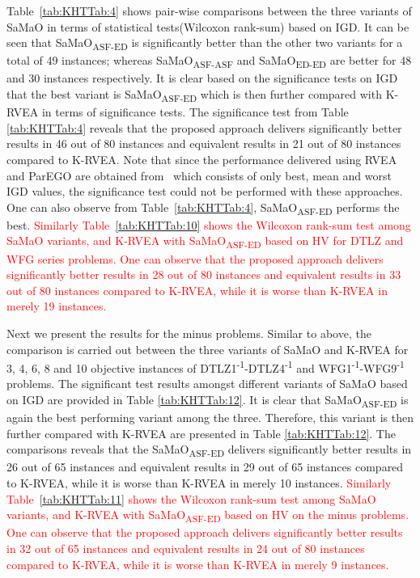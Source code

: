 \documentclass[twocolumn,10pt]{asme2ej}
\begin{document}
Table~\ref{tab:KHTTab:4} shows pair-wise comparisons between the three variants of SaMaO in terms of statistical tests(Wilcoxon rank-sum) based on IGD. It can be seen that SaMaO\textsubscript{ASF-ED} is significantly better than the other two variants for a total of 49 instances; whereas SaMaO\textsubscript{ASF-ASF} and SaMaO\textsubscript{ED-ED} are better for 48 and 30 instances respectively. It is clear based on the significance tests on IGD that the best variant is SaMaO\textsubscript{ASF-ED} which is then further compared with K-RVEA in terms of significance tests. The significance test from Table \ref{tab:KHTTab:4} reveals that the proposed approach delivers significantly better results in 46 out of 80 instances and equivalent results in 21 out of 80 instances compared to K-RVEA. Note that since the performance delivered using RVEA and ParEGO are obtained from~\cite{KHTchugh2016krvea} which consists of only best, mean and worst IGD values, the significance test could not be performed with these approaches. One can also observe from Table~\ref{tab:KHTTab:4}, SaMaO\textsubscript{ASF-ED} performs the best. \textcolor{red}{Similarly Table~\ref{tab:KHTTab:10} shows the Wilcoxon rank-sum test among SaMaO variants, and K-RVEA with SaMaO\textsubscript{ASF-ED} based on HV for DTLZ and WFG series problems. One can observe that the proposed approach delivers significantly better results in 28 out of 80 instances and equivalent results in 33 out of 80 instances compared to K-RVEA, while it is worse than K-RVEA in merely 19 instances.}


Next we present the results for the minus problems. Similar to above, the comparison is carried out between the three variants of SaMaO and K-RVEA for 3, 4, 6, 8 and 10 objective instances of DTLZ1\textsuperscript{-1}-DTLZ4\textsuperscript{-1} and WFG1\textsuperscript{-1}-WFG9\textsuperscript{-1} problems. The significant test results amongst different variants of SaMaO based on IGD are provided in Table \ref{tab:KHTTab:12}. It is clear that SaMaO\textsubscript{ASF-ED} is again the best performing variant among the three. Therefore, this variant is then further compared with K-RVEA are presented in Table \ref{tab:KHTTab:12}. The comparisons reveals that the SaMaO\textsubscript{ASF-ED} delivers significantly better results in 26 out of 65 instances and equivalent results in 29 out of 65 instances compared to K-RVEA, while it is worse than K-RVEA in merely 10 instances. \textcolor{red}{Similarly Table~\ref{tab:KHTTab:11} shows the Wilcoxon rank-sum test among SaMaO variants, and K-RVEA with SaMaO\textsubscript{ASF-ED} based on HV on the minus problems. One can observe that the proposed approach delivers significantly better results in 32 out of 65 instances and equivalent results in 24 out of 80 instances compared to K-RVEA, while it is worse than K-RVEA in merely 9 instances.}
\end{document}
